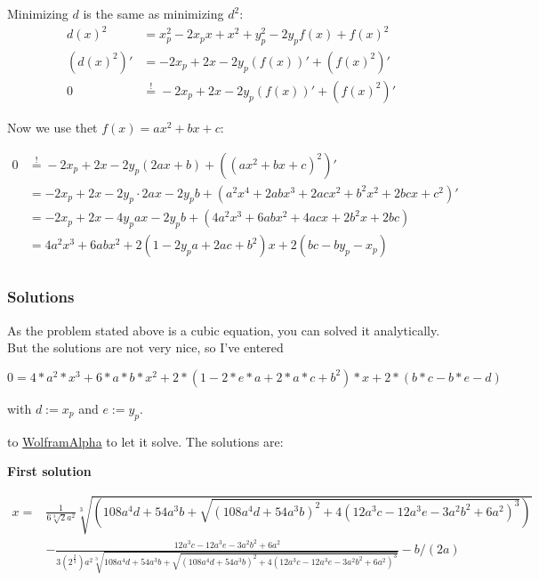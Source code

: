\documentclass[a4paper]{scrartcl}
\begin{document}
Minimizing $d$ is the same as minimizing $d^2$:
\begin{align}
    d(x)^2    &= x_p^2 - 2x_p x + x^2 + y_p^2 - 2y_p f(x) + f(x)^2\\
    (d(x)^2)' &= -2 x_p + 2x -2y_p(f(x))' + (f(x)^2)'\\
           0  &\stackrel{!}{=} -2 x_p + 2x -2y_p(f(x))' + (f(x)^2)' \label{eq:minimizing}
\end{align}

Now we use thet $f(x) = ax^2 + bx + c$:

\begin{align}
    0     &\stackrel{!}{=} -2 x_p + 2x -2y_p(2ax+b) + ((ax^2+bx+c)^2)'\\
          &= -2 x_p + 2x -2y_p \cdot 2ax-2 y_p b + (a^2 x^4+2 a b x^3+2 a c x^2+b^2 x^2+2 b c x+c^2)'\\
          &= -2 x_p + 2x -4y_p ax-2 y_p b + (4a^2 x^3 + 6 ab x^2 + 4acx + 2b^2 x + 2bc)\\
          &= 4a^2 x^3 + 6 ab x^2 + 2(1 -2y_p a+ 2ac + b^2)x +2(bc-by_p-x_p)\\
\end{align}

\subsubsection{Solutions}
As the problem stated above is a cubic equation, you can solved it
analytically. But the solutions are not very nice, so I've entered

\texttt{$0=4*a^2 *x^3 + 6 *a*b *x^2 + 2*(1 -2*e *a+ 2*a*c + b^2)*x +2*(b*c-b*e-d)$}

with $d := x_p$ and $e := y_p$.

to \href{http://www.wolframalpha.com/input/?i=0%3D4*a%5E2+*x%5E3+%2B+6+*a*b+*x%5E2+%2B+2*%281+-2*e+*a%2B+2*a*c+%2B+b%5E2%29*x+%2B2*%28b*c-b*e-d%29}{WolframAlpha} to let it solve. The solutions are:

\textbf{First solution}

\begin{align*}
    x = &\frac{1}{6 \sqrt[3]{2} a^2} \sqrt[3]{(108 a^4 d+54 a^3 b+\sqrt{(108 a^4 d+54 a^3 b)^2+4 (12 a^3 c-12 a^3 e-3 a^2 b^2+6 a^2)^3})}\\
        &-\frac{12 a^3 c-12 a^3 e-3 a^2 b^2+6 a^2}
         {3 (2^{\frac{2}{3}}) a^2 \sqrt[3]{108 a^4 d+54 a^3 b+\sqrt{(108 a^4 d+54 a^3 b)^2+4 (12 a^3 c-12 a^3 e-3 a^2 b^2+6 a^2)^3}} }-b/(2 a)
\end{align*}
\end{document}
